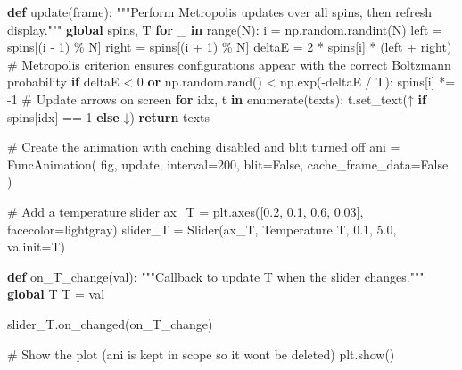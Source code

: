 \documentclass[
  letterpaper,
  enabledeprecatedfontcommands]{report}
\newenvironment{Shaded}{\begin{snugshade}}{\end{snugshade}}
\newcommand{\BuiltInTok}[1]{\textcolor[rgb]{0.00,0.23,0.31}{#1}}
\newcommand{\CommentTok}[1]{\textcolor[rgb]{0.37,0.37,0.37}{#1}}
\newcommand{\ControlFlowTok}[1]{\textcolor[rgb]{0.00,0.23,0.31}{\textbf{#1}}}
\newcommand{\DecValTok}[1]{\textcolor[rgb]{0.68,0.00,0.00}{#1}}
\newcommand{\FloatTok}[1]{\textcolor[rgb]{0.68,0.00,0.00}{#1}}
\newcommand{\KeywordTok}[1]{\textcolor[rgb]{0.00,0.23,0.31}{\textbf{#1}}}
\newcommand{\NormalTok}[1]{\textcolor[rgb]{0.00,0.23,0.31}{#1}}
\newcommand{\OperatorTok}[1]{\textcolor[rgb]{0.37,0.37,0.37}{#1}}
\newcommand{\StringTok}[1]{\textcolor[rgb]{0.13,0.47,0.30}{#1}}
\newcommand{\VariableTok}[1]{\textcolor[rgb]{0.07,0.07,0.07}{#1}}
\begin{document}
\begin{Shaded}
\begin{Highlighting}[]
\KeywordTok{def}\NormalTok{ update(frame):}
    \CommentTok{"""Perform Metropolis updates over all spins, then refresh display."""}
    \KeywordTok{global}\NormalTok{ spins, T}
    \ControlFlowTok{for}\NormalTok{ \_ }\KeywordTok{in} \BuiltInTok{range}\NormalTok{(N):}
\NormalTok{        i }\OperatorTok{=}\NormalTok{ np.random.randint(N)}
\NormalTok{        left }\OperatorTok{=}\NormalTok{ spins[(i }\OperatorTok{{-}} \DecValTok{1}\NormalTok{) }\OperatorTok{\%}\NormalTok{ N]}
\NormalTok{        right }\OperatorTok{=}\NormalTok{ spins[(i }\OperatorTok{+} \DecValTok{1}\NormalTok{) }\OperatorTok{\%}\NormalTok{ N]}
\NormalTok{        deltaE }\OperatorTok{=} \DecValTok{2} \OperatorTok{*}\NormalTok{ spins[i] }\OperatorTok{*}\NormalTok{ (left }\OperatorTok{+}\NormalTok{ right)}
        \CommentTok{\# Metropolis criterion ensures configurations appear with the correct Boltzmann probability}
        \ControlFlowTok{if}\NormalTok{ deltaE }\OperatorTok{\textless{}} \DecValTok{0} \KeywordTok{or}\NormalTok{ np.random.rand() }\OperatorTok{\textless{}}\NormalTok{ np.exp(}\OperatorTok{{-}}\NormalTok{deltaE }\OperatorTok{/}\NormalTok{ T):}
\NormalTok{            spins[i] }\OperatorTok{*=} \OperatorTok{{-}}\DecValTok{1}
    \CommentTok{\# Update arrows on screen}
    \ControlFlowTok{for}\NormalTok{ idx, t }\KeywordTok{in} \BuiltInTok{enumerate}\NormalTok{(texts):}
\NormalTok{        t.set\_text(}\StringTok{\textquotesingle{}↑\textquotesingle{}} \ControlFlowTok{if}\NormalTok{ spins[idx] }\OperatorTok{==} \DecValTok{1} \ControlFlowTok{else} \StringTok{\textquotesingle{}↓\textquotesingle{}}\NormalTok{)}
    \ControlFlowTok{return}\NormalTok{ texts}

\CommentTok{\# Create the animation with caching disabled and blit turned off}
\NormalTok{ani }\OperatorTok{=}\NormalTok{ FuncAnimation(}
\NormalTok{    fig,}
\NormalTok{    update,}
\NormalTok{    interval}\OperatorTok{=}\DecValTok{200}\NormalTok{,}
\NormalTok{    blit}\OperatorTok{=}\VariableTok{False}\NormalTok{,}
\NormalTok{    cache\_frame\_data}\OperatorTok{=}\VariableTok{False}
\NormalTok{)}

\CommentTok{\# Add a temperature slider}
\NormalTok{ax\_T }\OperatorTok{=}\NormalTok{ plt.axes([}\FloatTok{0.2}\NormalTok{, }\FloatTok{0.1}\NormalTok{, }\FloatTok{0.6}\NormalTok{, }\FloatTok{0.03}\NormalTok{], facecolor}\OperatorTok{=}\StringTok{\textquotesingle{}lightgray\textquotesingle{}}\NormalTok{)}
\NormalTok{slider\_T }\OperatorTok{=}\NormalTok{ Slider(ax\_T, }\StringTok{\textquotesingle{}Temperature T\textquotesingle{}}\NormalTok{, }\FloatTok{0.1}\NormalTok{, }\FloatTok{5.0}\NormalTok{, valinit}\OperatorTok{=}\NormalTok{T)}

\KeywordTok{def}\NormalTok{ on\_T\_change(val):}
    \CommentTok{"""Callback to update T when the slider changes."""}
    \KeywordTok{global}\NormalTok{ T}
\NormalTok{    T }\OperatorTok{=}\NormalTok{ val}

\NormalTok{slider\_T.on\_changed(on\_T\_change)}

\CommentTok{\# Show the plot (ani is kept in scope so it won\textquotesingle{}t be deleted)}
\NormalTok{plt.show()}
\end{Highlighting}
\end{Shaded}
\end{document}
